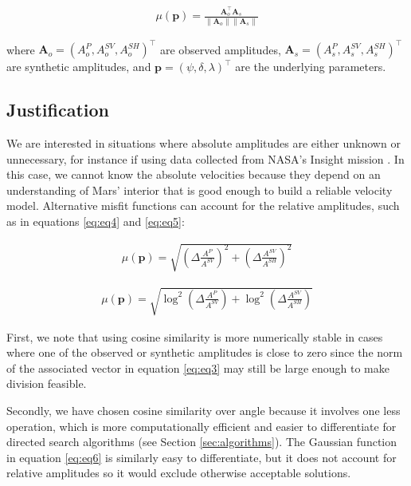 \documentclass[preprint]{seismica}
\begin{document}
    \begin{align} \label{eq:eq3}
      \mu(\bm{p}) = \frac{\bm{A}_o^\top\bm{A}_s}{\|\bm{A}_o\|\|\bm{A}_s\|}
    \end{align}

    where $\bm{A}_o = (A_o^P, A_o^{SV}, A_o^{SH})^\top$ are observed amplitudes, $\bm{A}_s =
    (A_s^P, A_s^{SV}, A_s^{SH})^\top$ are synthetic amplitudes, and
    $\bm{p} = (\psi, \delta, \lambda)^\top$ are the underlying parameters.

    \subsection{Justification}
    We are interested in situations where absolute amplitudes are either unknown or unnecessary, for
    instance if using data collected from NASA's Insight mission \citep{sita_potential_2022}.
    In this case, we cannot know the absolute velocities because they depend on an understanding of
    Mars' interior that is good enough to build a reliable velocity model. Alternative misfit
    functions can account for the relative amplitudes, such as in equations \ref{eq:eq4} and
    \ref{eq:eq5}:

    \begin{align} \label{eq:eq4}
      \mu(\bm{p}) = \sqrt{\left( \Delta \frac{A^{P}}{A^{SV}}\right)^2 + \left( \Delta \frac{A^{SV}}{A^{SH}}\right)^2}
    \end{align}

    \begin{align} \label{eq:eq5}
      \mu(\bm{p}) = \sqrt{\log^2 \left( \Delta \frac{A^P}{A^{SV}} \right) + \log^2 \left( \Delta \frac{A^{SV}}{A^{SH}} \right)}
    \end{align}

    First, we note that using cosine similarity is more numerically stable in cases where one of the
    observed or synthetic amplitudes is close to zero since the norm of the associated vector in
    equation \ref{eq:eq3} may still be large enough to make division feasible.

    Secondly, we have chosen cosine similarity over angle because it involves one less operation,
    which is more computationally efficient and easier to differentiate for directed search
    algorithms (see Section \ref{sec:algorithms}). The Gaussian function in equation \ref{eq:eq6} is
    similarly easy to differentiate, but it does not account for relative amplitudes so it would
    exclude otherwise acceptable solutions.
\end{document}
